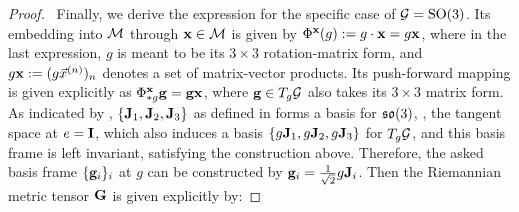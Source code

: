 \begin{proof}
    \itemc~Finally, we derive the expression for the specific case of $\mathcal{G} = \mathrm{SO}(3)$. Its embedding into $\mathcal{M}$ through $\mathbf{x} \in \mathcal{M}$ is given by $\Phi^{\mathbf{x}}(g):=g\cdot\mathbf{x} = g \mathbf{x}$, where in the last expression, $g$ is meant to be its $3\times3$ rotation-matrix form, and $g \mathbf{x} := (g \vec{x}^{(n)})_n$ denotes a set of matrix-vector products.
    Its push-forward mapping is given explicitly as $\Phi^{\mathbf{x}}_{*g} \mathbf{g} = \mathbf{g} \mathbf{x}$, where $\mathbf{g} \in T_g \mathcal{G}$ also takes its $3\times3$ matrix form.
    As indicated by , $\{\mathbf{J}_1, \mathbf{J}_2, \mathbf{J}_3\}$ as defined in  forms a basis for $\mathfrak{so}(3)$, \ie, the tangent space at $e=\mathbf{I}$, which also induces a basis $\{g \mathbf{J}_1, g \mathbf{J}_2, g \mathbf{J}_3\}$ for $T_g \mathcal{G}$, and this basis frame is left invariant, satisfying the construction above. 
    Therefore, the asked basis frame $\{\mathbf{g}_i\}_i$ at $g$ can be constructed by $\mathbf{g}_i = \frac1{\sqrt{2}} g \mathbf{J}_i$.
    Then the Riemannian metric tensor $\mathbf{G}$ is given explicitly by:


\end{proof}
